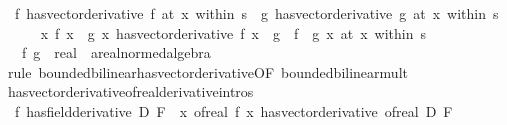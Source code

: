 \begin{isabellebody}
\ \ {\isachardoublequoteopen}{\isacharparenleft}{\kern0pt}f\ has{\isacharunderscore}{\kern0pt}vector{\isacharunderscore}{\kern0pt}derivative\ f{\isacharprime}{\kern0pt}{\isacharparenright}{\kern0pt}\ {\isacharparenleft}{\kern0pt}at\ x\ within\ s{\isacharparenright}{\kern0pt}\ {\isasymLongrightarrow}\ {\isacharparenleft}{\kern0pt}g\ has{\isacharunderscore}{\kern0pt}vector{\isacharunderscore}{\kern0pt}derivative\ g{\isacharprime}{\kern0pt}{\isacharparenright}{\kern0pt}\ {\isacharparenleft}{\kern0pt}at\ x\ within\ s{\isacharparenright}{\kern0pt}\ {\isasymLongrightarrow}\isanewline
\ \ \ \ {\isacharparenleft}{\kern0pt}{\isacharparenleft}{\kern0pt}{\isasymlambda}x{\isachardot}{\kern0pt}\ f\ x\ {\isacharasterisk}{\kern0pt}\ g\ x{\isacharparenright}{\kern0pt}\ has{\isacharunderscore}{\kern0pt}vector{\isacharunderscore}{\kern0pt}derivative\ {\isacharparenleft}{\kern0pt}f\ x\ {\isacharasterisk}{\kern0pt}\ g{\isacharprime}{\kern0pt}\ {\isacharplus}{\kern0pt}\ f{\isacharprime}{\kern0pt}\ {\isacharasterisk}{\kern0pt}\ g\ x{\isacharparenright}{\kern0pt}{\isacharparenright}{\kern0pt}\ {\isacharparenleft}{\kern0pt}at\ x\ within\ s{\isacharparenright}{\kern0pt}{\isachardoublequoteclose}\isanewline
\ \ \ f\ g\ {\isacharcolon}{\kern0pt}{\isacharcolon}{\kern0pt}\ {\isachardoublequoteopen}real\ {\isasymRightarrow}\ {\isacharprime}{\kern0pt}a{\isacharcolon}{\kern0pt}{\isacharcolon}{\kern0pt}real{\isacharunderscore}{\kern0pt}normed{\isacharunderscore}{\kern0pt}algebra{\isachardoublequoteclose}\isanewline
%
\isadelimproof
\ \ %
\endisadelimproof
%
\isatagproof
{}\isamarkupfalse%
\ {\isacharparenleft}{\kern0pt}rule\ bounded{\isacharunderscore}{\kern0pt}bilinear{\isachardot}{\kern0pt}has{\isacharunderscore}{\kern0pt}vector{\isacharunderscore}{\kern0pt}derivative{\isacharbrackleft}{\kern0pt}OF\ bounded{\isacharunderscore}{\kern0pt}bilinear{\isacharunderscore}{\kern0pt}mult{\isacharbrackright}{\kern0pt}{\isacharparenright}{\kern0pt}%
\endisatagproof
{\isafoldproof}%
%
\isadelimproof
\isanewline
%
\endisadelimproof
\isanewline
{}\isamarkupfalse%
\ has{\isacharunderscore}{\kern0pt}vector{\isacharunderscore}{\kern0pt}derivative{\isacharunderscore}{\kern0pt}of{\isacharunderscore}{\kern0pt}real{\isacharbrackleft}{\kern0pt}derivative{\isacharunderscore}{\kern0pt}intros{\isacharbrackright}{\kern0pt}{\isacharcolon}{\kern0pt}\isanewline
\ \ {\isachardoublequoteopen}{\isacharparenleft}{\kern0pt}f\ has{\isacharunderscore}{\kern0pt}field{\isacharunderscore}{\kern0pt}derivative\ D{\isacharparenright}{\kern0pt}\ F\ {\isasymLongrightarrow}\ {\isacharparenleft}{\kern0pt}{\isacharparenleft}{\kern0pt}{\isasymlambda}x{\isachardot}{\kern0pt}\ of{\isacharunderscore}{\kern0pt}real\ {\isacharparenleft}{\kern0pt}f\ x{\isacharparenright}{\kern0pt}{\isacharparenright}{\kern0pt}\ has{\isacharunderscore}{\kern0pt}vector{\isacharunderscore}{\kern0pt}derivative\ {\isacharparenleft}{\kern0pt}of{\isacharunderscore}{\kern0pt}real\ D{\isacharparenright}{\kern0pt}{\isacharparenright}{\kern0pt}\ F{\isachardoublequoteclose}\isanewline

\end{isabellebody}
